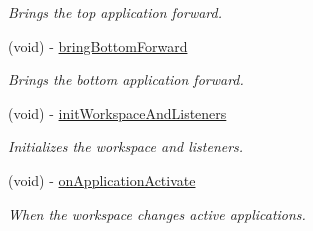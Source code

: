 \begin{DoxyCompactItemize}
\begin{DoxyCompactList}\small\item\em Brings the top application forward. \item\end{DoxyCompactList}\item 
\hypertarget{interface_g_d_active_application_stack_a160fa1a7f45df169168c7c1aebd98290}{
(void) -\/ \hyperlink{interface_g_d_active_application_stack_a160fa1a7f45df169168c7c1aebd98290}{bringBottomForward}}
\label{interface_g_d_active_application_stack_a160fa1a7f45df169168c7c1aebd98290}

\begin{DoxyCompactList}\small\item\em Brings the bottom application forward. \item\end{DoxyCompactList}\item 
\hypertarget{interface_g_d_active_application_stack_a8686d384529748f578fdc1b82d829656}{
(void) -\/ \hyperlink{interface_g_d_active_application_stack_a8686d384529748f578fdc1b82d829656}{initWorkspaceAndListeners}}
\label{interface_g_d_active_application_stack_a8686d384529748f578fdc1b82d829656}

\begin{DoxyCompactList}\small\item\em Initializes the workspace and listeners. \item\end{DoxyCompactList}\item 
\hypertarget{interface_g_d_active_application_stack_aa5c4c884f50cf0e1d18dc909ed7af8e7}{
(void) -\/ \hyperlink{interface_g_d_active_application_stack_aa5c4c884f50cf0e1d18dc909ed7af8e7}{onApplicationActivate}}
\label{interface_g_d_active_application_stack_aa5c4c884f50cf0e1d18dc909ed7af8e7}

\begin{DoxyCompactList}\small\item\em When the workspace changes active applications. \item\end{DoxyCompactList}\end{DoxyCompactItemize}
